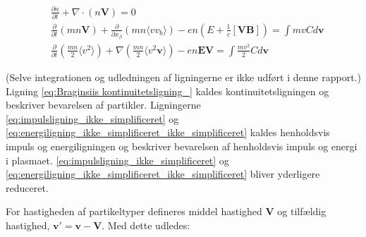 \begin{align}
    &\frac{\partial n}{\partial t} + \nabla \cdot (n \mathbf{V}) = 0 \label{eq:Braginsiis kontinuitetsligning_}\\
    &\frac{\partial}{\partial t}\left(m n \mathbf{V}\right) + \frac{\partial}{\partial x_\beta} \left(m n \langle v v_b \rangle \right) 
    - en\left(E + \frac{1}{c} \left[\mathbf{VB}\right]\right) = \int mv C d\mathbf{v} \label{eq:impulsligning_ikke_simplificeret}\\
    &\frac{\partial}{\partial t} \left(\frac{mn}{2} \langle v^2 \rangle\right)  + \nabla \left(\frac{m n}{2} \langle v^2\mathbf{v} \rangle \right)
    -en\mathbf{EV} = \int \frac{mv^2}{2}Cd\mathbf{v} \label{eq:energiligning_ikke_simplificeret_ikke_simplificeret}
\end{align}

(Selve integrationen og udledningen af ligningerne er ikke udført i denne rapport.)
Ligning \eqref{eq:Braginsiis kontinuitetsligning_} kaldes kontinuitetsligningen og beskriver bevarelsen af partikler.
Ligningerne \eqref{eq:impulsligning_ikke_simplificeret} og \eqref{eq:energiligning_ikke_simplificeret_ikke_simplificeret}
kaldes henholdsvis impuls og energiligningen og beskriver bevarelsen af henholdsvis impuls og energi i plasmaet.
\eqref{eq:impulsligning_ikke_simplificeret} og \eqref{eq:energiligning_ikke_simplificeret_ikke_simplificeret} bliver yderligere 
reduceret. 

For hastigheden af partikeltyper defineres middel hastighed $\mathbf{V}$ og tilfældig hastighed, $\mathbf{v'} =  \mathbf{v - V}$.
Med dette udledes:

